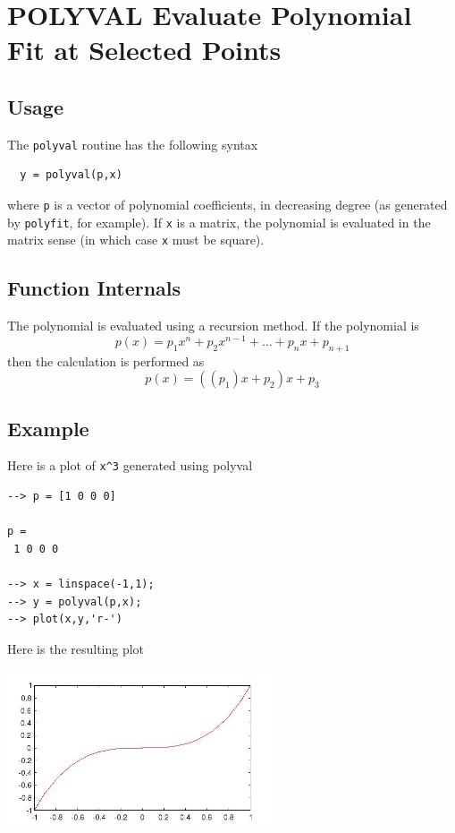 \section{POLYVAL Evaluate Polynomial Fit at Selected Points}

\subsection{Usage}

The \verb|polyval| routine has the following syntax
\begin{verbatim}
  y = polyval(p,x)
\end{verbatim}
where \verb|p| is a vector of polynomial coefficients,
in decreasing degree (as generated by \verb|polyfit|, for example).
If \verb|x| is a matrix, the polynomial is evaluated in the matrix
sense (in which case \verb|x| must be square).
\subsection{Function Internals}

The polynomial is evaluated using a recursion method.  If the
polynomial is
\[
   p(x) = p_1 x^n + p_2 x^{n-1} + \dots + p_n x + p_{n+1}
\]
then the calculation is performed as
\[
   p(x) = ((p_1) x + p_2) x + p_3
\]
\subsection{Example}

Here is a plot of \verb|x^3| generated using polyval
\begin{verbatim}
--> p = [1 0 0 0]

p = 
 1 0 0 0 

--> x = linspace(-1,1);
--> y = polyval(p,x);
--> plot(x,y,'r-')
\end{verbatim}
Here is the resulting plot


\centerline{\includegraphics[width=8cm]{polyval1}}

